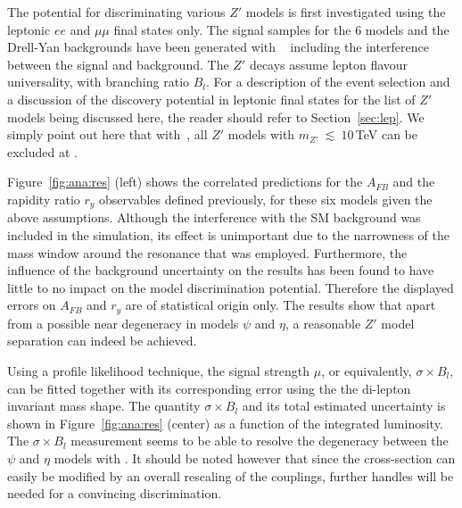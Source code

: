The potential for discriminating various $Z'$ models is first investigated using the leptonic $ee$ and $\mu\mu$ final states only. The signal samples for the 6 models and the Drell-Yan backgrounds have been generated with \py~\cite{Sjostrand:2014zea} including the interference between the signal and background. The $Z'$ decays assume lepton flavour universality, with branching ratio $B_l$. For a description of the event selection and a discussion of the discovery potential in leptonic final states for the list of $Z'$ models being discussed here, the reader should refer to Section~\ref{sec:lep}. We simply point out here that with \intlumihelhc\,, all $Z'$ models with $m_{Z'}~\lesssim~10$\,TeV can be excluded at \sqrtshelhc.

Figure~\ref{fig:ana:res} (left) shows the correlated predictions for the $A_{FB}$ and the rapidity ratio $r_y$ observables defined previously, for these six models given the above assumptions. Although the interference with the SM background was included in the simulation, its effect is unimportant due to the narrowness of the mass window around the resonance that was employed. Furthermore, the influence of the background uncertainty on the results has been found to have little to no impact on the model discrimination potential. Therefore the displayed errors on $A_{FB}$ and $r_y$ are of statistical origin only. The results show that apart from a possible near degeneracy in models $\psi$ and $\eta$, a reasonable $Z'$ model separation can indeed be achieved.

Using a profile likelihood technique, the signal strength $\mu$, or equivalently, $\sigma \times B_l$, can be fitted together with its corresponding error using the the di-lepton invariant mass shape. The quantity $\sigma \times B_l$ and its total estimated uncertainty is shown in Figure~\ref{fig:ana:res} (center) as a function of the integrated luminosity. The $\sigma \times B_l$ measurement seems to be able to resolve the degeneracy between the $\psi$ and $\eta$ models with \intlumihelhc. It should be noted however that since the cross-section can easily be modified by an overall rescaling of the couplings, further handles will be needed for a convincing discrimination.


